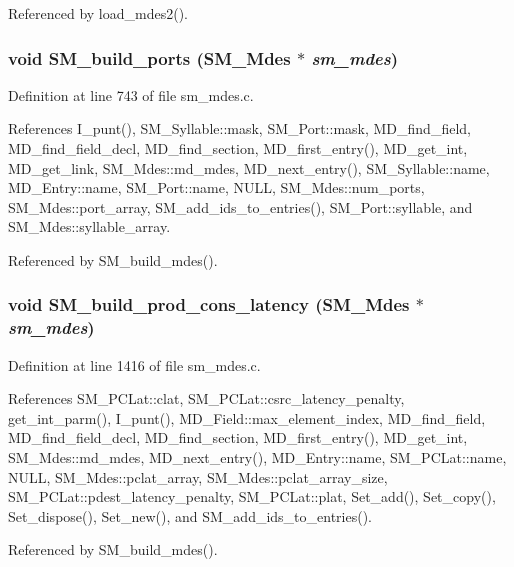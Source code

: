 Referenced by load\_\-mdes2().
\subsubsection{\setlength{\rightskip}{0pt plus 5cm}void SM\_\-build\_\-ports (\bf{SM\_\-Mdes} $\ast$ {\em sm\_\-mdes})}\label{sm__mdes_8c_a9ddf4b929e903de405865e4b054fd23}




Definition at line 743 of file sm\_\-mdes.c.

References I\_\-punt(), SM\_\-Syllable::mask, SM\_\-Port::mask, MD\_\-find\_\-field, MD\_\-find\_\-field\_\-decl, MD\_\-find\_\-section, MD\_\-first\_\-entry(), MD\_\-get\_\-int, MD\_\-get\_\-link, SM\_\-Mdes::md\_\-mdes, MD\_\-next\_\-entry(), SM\_\-Syllable::name, MD\_\-Entry::name, SM\_\-Port::name, NULL, SM\_\-Mdes::num\_\-ports, SM\_\-Mdes::port\_\-array, SM\_\-add\_\-ids\_\-to\_\-entries(), SM\_\-Port::syllable, and SM\_\-Mdes::syllable\_\-array.

Referenced by SM\_\-build\_\-mdes().
\subsubsection{\setlength{\rightskip}{0pt plus 5cm}void SM\_\-build\_\-prod\_\-cons\_\-latency (\bf{SM\_\-Mdes} $\ast$ {\em sm\_\-mdes})}\label{sm__mdes_8c_87a9e6302fda5c01d1a0484b39ab66fe}




Definition at line 1416 of file sm\_\-mdes.c.

References SM\_\-PCLat::clat, SM\_\-PCLat::csrc\_\-latency\_\-penalty, get\_\-int\_\-parm(), I\_\-punt(), MD\_\-Field::max\_\-element\_\-index, MD\_\-find\_\-field, MD\_\-find\_\-field\_\-decl, MD\_\-find\_\-section, MD\_\-first\_\-entry(), MD\_\-get\_\-int, SM\_\-Mdes::md\_\-mdes, MD\_\-next\_\-entry(), MD\_\-Entry::name, SM\_\-PCLat::name, NULL, SM\_\-Mdes::pclat\_\-array, SM\_\-Mdes::pclat\_\-array\_\-size, SM\_\-PCLat::pdest\_\-latency\_\-penalty, SM\_\-PCLat::plat, Set\_\-add(), Set\_\-copy(), Set\_\-dispose(), Set\_\-new(), and SM\_\-add\_\-ids\_\-to\_\-entries().

Referenced by SM\_\-build\_\-mdes().
